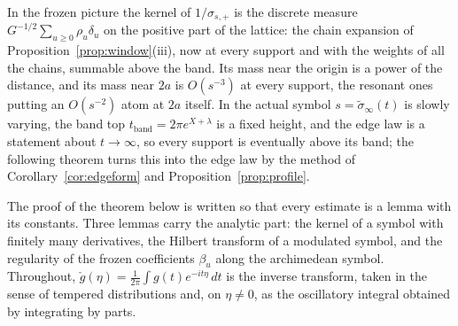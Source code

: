 \documentclass[11pt]{article}
\theoremstyle{definition}
\theoremstyle{remark}
\begin{document}
In the frozen picture the kernel of $1/\sigma_{s,+}$ is the discrete measure $G^{-1/2}\sum_{u\ge0}\rho_u\delta_u$ on the positive part of the lattice: the chain expansion of Proposition~\ref{prop:window}(iii), now at every support and with the weights of all the chains, summable above the band. Its mass near the origin is a power of the distance, and its mass near $2a$ is $O(s^{-3})$ at every support, the resonant ones putting an $O(s^{-2})$ atom at $2a$ itself. In the actual symbol $s=\tilde\sigma_\infty(t)$ is slowly varying, the band top $t_{\mathrm{band}}=2\pi e^{X+\lambda}$ is a fixed height, and the edge law is a statement about $t\to\infty$, so every support is eventually above its band; the following theorem turns this into the edge law by the method of Corollary~\ref{cor:edgeform} and Proposition~\ref{prop:profile}.

The proof of the theorem below is written so that every estimate is a lemma with its constants. Three lemmas carry the analytic part: the kernel of a symbol with finitely many derivatives, the Hilbert transform of a modulated symbol, and the regularity of the frozen coefficients $\beta_u$ along the archimedean symbol. Throughout, $\check g(\eta)=\frac1{2\pi}\int g(t)e^{-it\eta}\,dt$ is the inverse transform, taken in the sense of tempered distributions and, on $\eta\ne0$, as the oscillatory integral obtained by integrating by parts.
\end{document}
